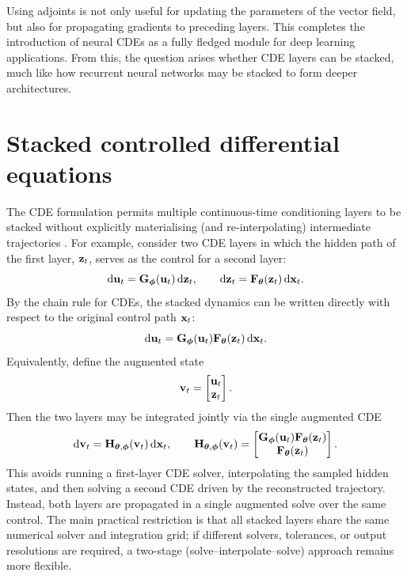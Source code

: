Using adjoints is not only useful for updating the parameters of the vector field, but also for propagating gradients to preceding layers. This completes the introduction of neural \acp{CDE} as a fully fledged module for deep learning applications. From this, the question arises whether \ac{CDE} layers can be stacked, much like how recurrent neural networks may be stacked to form deeper architectures.

\section{Stacked controlled differential equations}

The \ac{CDE} formulation permits multiple continuous-time conditioning layers to be stacked without explicitly materialising (and re-interpolating) intermediate trajectories \citep{jhin2021attncde,kidger2021thesis}. For example, consider two \ac{CDE} layers in which the hidden path of the first layer, ${\mathbf{z}}_t$, serves as the control for a second layer:
\[
    \mathrm{d}{\mathbf{u}}_t = {\mathbf{G}}_{{\bm{\phi}}}({\mathbf{u}}_t)\,\mathrm{d}{\mathbf{z}}_t,
    \qquad
    \mathrm{d}{\mathbf{z}}_t = {\mathbf{F}}_{{\bm{\theta}}}({\mathbf{z}}_t)\,\mathrm{d}{\mathbf{x}}_t.
\]
By the chain rule for \acp{CDE}, the stacked dynamics can be written directly with respect to the original control path ${\mathbf{x}}_t$:
\[
    \mathrm{d}{\mathbf{u}}_t
    =
    {\mathbf{G}}_{{\bm{\phi}}}({\mathbf{u}}_t){\mathbf{F}}_{{\bm{\theta}}}({\mathbf{z}}_t)\,\mathrm{d}{\mathbf{x}}_t.
\]
Equivalently, define the augmented state
\[
    {\mathbf{v}}_t =
    \begin{bmatrix}
        {\mathbf{u}}_t \\
        {\mathbf{z}}_t
    \end{bmatrix}.
\]
Then the two layers may be integrated jointly via the single augmented \ac{CDE}
\[
    \mathrm{d}{\mathbf{v}}_t
    =
    {\mathbf{H}}_{{\bm{\theta}},{\bm{\phi}}}({\mathbf{v}}_t)\,\mathrm{d}{\mathbf{x}}_t,
    \qquad
    {\mathbf{H}}_{{\bm{\theta}},{\bm{\phi}}}({\mathbf{v}}_t)
    =
    \begin{bmatrix}
        {\mathbf{G}}_{{\bm{\phi}}}({\mathbf{u}}_t){\mathbf{F}}_{{\bm{\theta}}}({\mathbf{z}}_t) \\
        {\mathbf{F}}_{{\bm{\theta}}}({\mathbf{z}}_t)
    \end{bmatrix}.
\]
This avoids running a first-layer \ac{CDE} solver, interpolating the sampled hidden states, and then solving a second \ac{CDE} driven by the reconstructed trajectory. Instead, both layers are propagated in a single augmented solve over the same control. The main practical restriction is that all stacked layers share the same numerical solver and integration grid; if different solvers, tolerances, or output resolutions are required, a two-stage (solve--interpolate--solve) approach remains more flexible.

